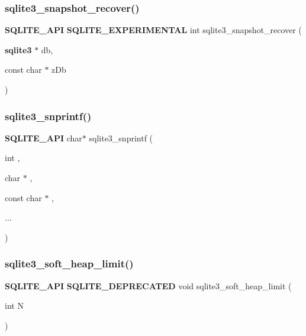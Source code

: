 \mbox{\label{sqlite3_8h_a0fc90c942b30b49b82e7556410026ba6}} 
\subsubsection{sqlite3\_snapshot\_recover()}
{\footnotesize\ttfamily \textbf{ S\+Q\+L\+I\+T\+E\+\_\+\+A\+PI} \textbf{ S\+Q\+L\+I\+T\+E\+\_\+\+E\+X\+P\+E\+R\+I\+M\+E\+N\+T\+AL} int sqlite3\+\_\+snapshot\+\_\+recover (\begin{DoxyParamCaption}\item[{\textbf{ sqlite3} $\ast$}]{db,  }\item[{const char $\ast$}]{z\+Db }\end{DoxyParamCaption})}

\mbox{\label{sqlite3_8h_af4558fab7cb8fb1e61fd642d3e017ef7}} 
\subsubsection{sqlite3\_snprintf()}
{\footnotesize\ttfamily \textbf{ S\+Q\+L\+I\+T\+E\+\_\+\+A\+PI} char$\ast$ sqlite3\+\_\+snprintf (\begin{DoxyParamCaption}\item[{int}]{,  }\item[{char $\ast$}]{,  }\item[{const char $\ast$}]{,  }\item[{}]{... }\end{DoxyParamCaption})}

\mbox{\label{sqlite3_8h_a18c3472581de3072201723e798524fdc}} 
\subsubsection{sqlite3\_soft\_heap\_limit()}
{\footnotesize\ttfamily \textbf{ S\+Q\+L\+I\+T\+E\+\_\+\+A\+PI} \textbf{ S\+Q\+L\+I\+T\+E\+\_\+\+D\+E\+P\+R\+E\+C\+A\+T\+ED} void sqlite3\+\_\+soft\+\_\+heap\+\_\+limit (\begin{DoxyParamCaption}\item[{int}]{N }\end{DoxyParamCaption})}

